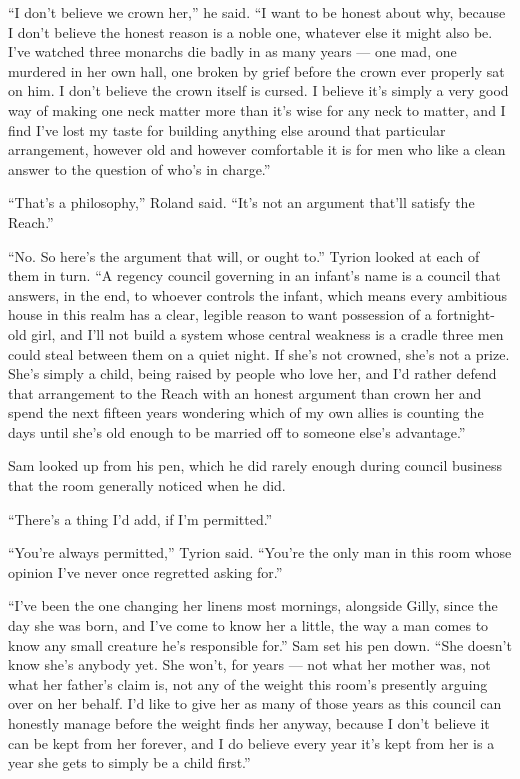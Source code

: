 “I don’t believe we crown her,” he said. “I want to be honest about why, because I don’t believe the honest reason is a noble one, whatever else it might also be. I’ve watched three monarchs die badly in as many years — one mad, one murdered in her own hall, one broken by grief before the crown ever properly sat on him. I don’t believe the crown itself is cursed. I believe it’s simply a very good way of making one neck matter more than it’s wise for any neck to matter, and I find I’ve lost my taste for building anything else around that particular arrangement, however old and however comfortable it is for men who like a clean answer to the question of who’s in charge.”

“That’s a philosophy,” Roland said. “It’s not an argument that’ll satisfy the Reach.”

“No. So here’s the argument that will, or ought to.” Tyrion looked at each of them in turn. “A regency council governing in an infant’s name is a council that answers, in the end, to whoever controls the infant, which means every ambitious house in this realm has a clear, legible reason to want possession of a fortnight-old girl, and I’ll not build a system whose central weakness is a cradle three men could steal between them on a quiet night. If she’s not crowned, she’s not a prize. She’s simply a child, being raised by people who love her, and I’d rather defend that arrangement to the Reach with an honest argument than crown her and spend the next fifteen years wondering which of my own allies is counting the days until she’s old enough to be married off to someone else’s advantage.”

\sceneBreak

Sam looked up from his pen, which he did rarely enough during council business that the room generally noticed when he did.

“There’s a thing I’d add, if I’m permitted.”

“You’re always permitted,” Tyrion said. “You’re the only man in this room whose opinion I’ve never once regretted asking for.”

“I’ve been the one changing her linens most mornings, alongside Gilly, since the day she was born, and I’ve come to know her a little, the way a man comes to know any small creature he’s responsible for.” Sam set his pen down. “She doesn’t know she’s anybody yet. She won’t, for years — not what her mother was, not what her father’s claim is, not any of the weight this room’s presently arguing over on her behalf. I’d like to give her as many of those years as this council can honestly manage before the weight finds her anyway, because I don’t believe it can be kept from her forever, and I do believe every year it’s kept from her is a year she gets to simply be a child first.”

